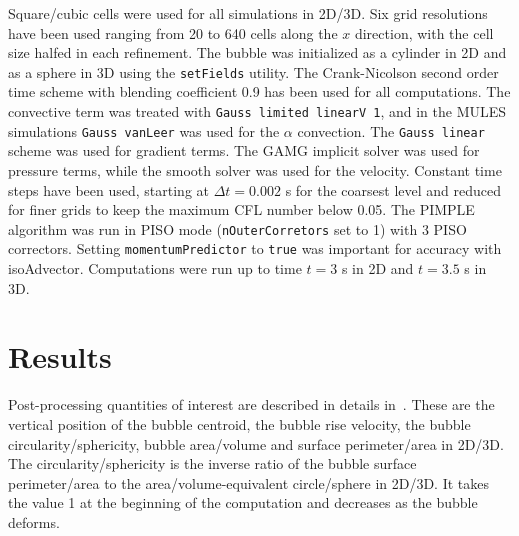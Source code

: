 \documentclass[review]{elsarticle}
\begin{document}
Square/cubic cells were used for all simulations in 2D/3D. Six grid resolutions have been used ranging from 20 to 640 cells along the $x$ direction, with the cell size halfed in each refinement. The bubble was initialized as a cylinder in 2D and as a sphere in 3D using the \verb+setFields+ utility. The Crank-Nicolson second order time scheme with blending coefficient 0.9 has been used for all computations. The convective term was treated with \verb+Gauss limited linearV 1+, and in the MULES simulations \verb+Gauss vanLeer+ was used for the $\alpha$ convection. The \verb+Gauss linear+ scheme was used for gradient terms. The GAMG implicit solver was used for pressure terms, while the smooth solver was used for the velocity. Constant time steps have been used, starting at $\Delta t=0.002$ s for the coarsest level and reduced for finer grids to keep the maximum CFL number below 0.05. The PIMPLE algorithm was run in PISO mode (\verb+nOuterCorretors+ set to 1) with 3 PISO correctors. Setting \verb+momentumPredictor+ to \verb+true+ was important for accuracy with isoAdvector. Computations were run up to time $t=3$ s in 2D and $t=3.5$ s in 3D. 

\section{Results}\label{sec_results}
Post-processing quantities of interest are described in details in~\cite{Hysing2009,Adelsberger2014}. These are the vertical position of the bubble centroid, the bubble rise velocity, the bubble circularity/sphericity, bubble area/volume and surface perimeter/area in 2D/3D. The circularity/sphericity is the inverse ratio of the bubble surface perimeter/area to the area/volume-equivalent circle/sphere in 2D/3D. It takes the value 1 at the beginning of the computation and decreases as the bubble deforms.
   
\end{document}
